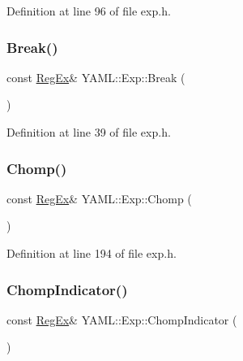 Definition at line 96 of file exp.\+h.

\mbox{\label{namespace_y_a_m_l_1_1_exp_ae9be2384dfda70daa8f5e9e9f6509383}} 
\subsubsection{\texorpdfstring{Break()}{Break()}}
{\footnotesize\ttfamily const \mbox{\hyperlink{class_y_a_m_l_1_1_reg_ex}{Reg\+Ex}}\& Y\+A\+M\+L\+::\+Exp\+::\+Break (\begin{DoxyParamCaption}{ }\end{DoxyParamCaption})\hspace{0.3cm}{\ttfamily [inline]}}



Definition at line 39 of file exp.\+h.

\mbox{\label{namespace_y_a_m_l_1_1_exp_aca3cd79f5c53a3e165058228e7d45441}} 
\subsubsection{\texorpdfstring{Chomp()}{Chomp()}}
{\footnotesize\ttfamily const \mbox{\hyperlink{class_y_a_m_l_1_1_reg_ex}{Reg\+Ex}}\& Y\+A\+M\+L\+::\+Exp\+::\+Chomp (\begin{DoxyParamCaption}{ }\end{DoxyParamCaption})\hspace{0.3cm}{\ttfamily [inline]}}



Definition at line 194 of file exp.\+h.

\mbox{\label{namespace_y_a_m_l_1_1_exp_a951a08534d9d41ff1c0758efa1265f76}} 
\subsubsection{\texorpdfstring{ChompIndicator()}{ChompIndicator()}}
{\footnotesize\ttfamily const \mbox{\hyperlink{class_y_a_m_l_1_1_reg_ex}{Reg\+Ex}}\& Y\+A\+M\+L\+::\+Exp\+::\+Chomp\+Indicator (\begin{DoxyParamCaption}{ }\end{DoxyParamCaption})\hspace{0.3cm}{\ttfamily [inline]}}



